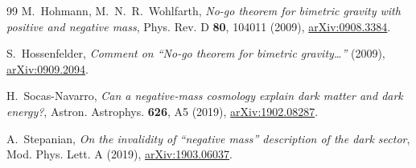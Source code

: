\documentclass[11pt,a4paper]{article}
\theoremstyle{definition}
\theoremstyle{plain}
\begin{document}
\begin{thebibliography}{99}
 M.~Hohmann, M.~N.~R.~Wohlfarth,
\emph{No-go theorem for bimetric gravity with positive and negative mass},
Phys. Rev. D \textbf{80}, 104011 (2009), \href{https://arxiv.org/abs/0908.3384}{arXiv:0908.3384}.

 S.~Hossenfelder,
\emph{Comment on ``No-go theorem for bimetric gravity\dots''} (2009),
\href{https://arxiv.org/abs/0909.2094}{arXiv:0909.2094}.

 H.~Socas-Navarro,
\emph{Can a negative-mass cosmology explain dark matter and dark energy?},
Astron. Astrophys. \textbf{626}, A5 (2019), \href{https://arxiv.org/abs/1902.08287}{arXiv:1902.08287}.

 A.~Stepanian,
\emph{On the invalidity of ``negative mass'' description of the dark sector},
Mod. Phys. Lett. A (2019), \href{https://arxiv.org/abs/1903.06037}{arXiv:1903.06037}.

\end{thebibliography}
\end{document}
